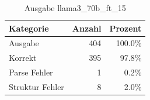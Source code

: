 
\begin{table}[!ht]
\centering
\begin{tabular}{lrr}
\toprule
\textbf{Kategorie} & \textbf{Anzahl} & \textbf{Prozent} \\
\midrule
Ausgabe & 404 & 100.0\% \\
Korrekt & 395 & 97.8\% \\
Parse Fehler & 1 & 0.2\% \\
Struktur Fehler & 8 & 2.0\% \\
\bottomrule
\end{tabular}
\caption{Ausgabe llama3_70b_ft_15}
\label{tab:file_counts}
\end{table}
    